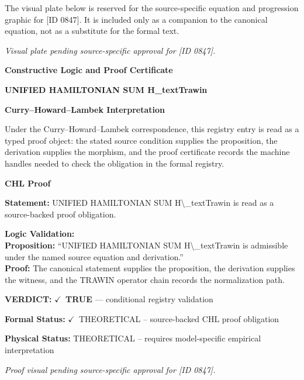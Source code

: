\begingroup\footnotesize\sloppy
The visual plate below is reserved for the source-specific equation and progression graphic for [ID 0847]. It is included only as a companion to the canonical equation, not as a substitute for the formal text.
\par\endgroup
\begingroup\footnotesize\itshape
Visual plate pending source-specific approval for [ID 0847].
\par\endgroup

\clearpage
\begingroup\tzpsupportsetup
\noindent\textbf{\fontsize{10.8pt}{12.8pt}\selectfont [ID 0847] Constructive Logic and Proof Certificate}\par
\noindent\textbf{\fontsize{10pt}{12pt}\selectfont UNIFIED HAMILTONIAN SUM H\_textTrawin}\par
\vspace{0.45em}
\begingroup
\footnotesize
\setlength{\parskip}{0.22em}
\setlength{\parindent}{0pt}
\noindent\textbf{Curry--Howard--Lambek Interpretation}\par
Under the Curry--Howard--Lambek correspondence, this registry entry is read as a typed proof
object: the stated source condition supplies the proposition, the derivation supplies the
morphism, and the proof certificate records the machine handles needed to check the obligation
in the formal registry.

\vspace{0.45em}
\noindent\textbf{CHL Proof}\par
\textbf{Statement:} UNIFIED HAMILTONIAN SUM H\textbackslash{}\_textTrawin is read as a source-backed proof obligation.

\textbf{Logic Validation:}\\
\textbf{Proposition:} ``UNIFIED HAMILTONIAN SUM H\textbackslash{}\_textTrawin is admissible under the named source equation and derivation.''\\
\textbf{Proof:} The canonical statement supplies the proposition, the derivation supplies the witness, and the TRAWIN operator chain records the normalization path.

\textbf{VERDICT:} \ensuremath{\checkmark}\ \textbf{TRUE} --- conditional registry validation

\textbf{Formal Status:} \ensuremath{\checkmark}\ THEORETICAL -- source-backed CHL proof obligation

\textbf{Physical Status:} THEORETICAL -- requires model-specific empirical interpretation
\par\vspace{0.45em}
\par
\vfill
\begingroup\footnotesize\itshape
Proof visual pending source-specific approval for [ID 0847].
\par\endgroup
\vfill
\endgroup
\endgroup
